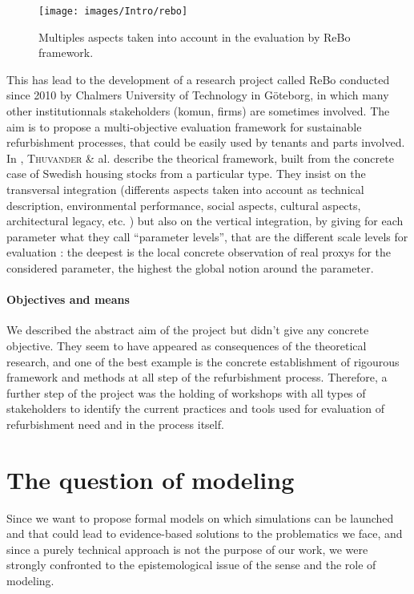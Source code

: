 \documentclass[english]{article}
\newcommand{\noun}[1]{\textsc{#1}}
\begin{document}
\begin{figure}
\texttt{[image: images/Intro/rebo]}\caption{Multiples aspects taken into account in the evaluation by ReBo framework.}


\end{figure}


\bigskip{}


This has lead to the development of a research project called ReBo
conducted since 2010 by Chalmers University of Technology in Göteborg,
in which many other institutionnals stakeholders (komun, firms) are
sometimes involved. The aim is to propose a multi-objective evaluation
framework for sustainable refurbishment processes, that could be easily
used by tenants and parts involved. In \cite{thuvander2011strategies},
\noun{Thuvander} \& al. describe the theorical framework, built from
the concrete case of Swedish housing stocks from a particular type.
They insist on the transversal integration (differents aspects taken
into account as technical description, environmental performance,
social aspects, cultural aspects, architectural legacy, etc. ) but
also on the vertical integration, by giving for each parameter what
they call ``parameter levels'', that are the different scale levels
for evaluation : the deepest is the local concrete observation of
real proxys for the considered parameter, the highest the global notion
around the parameter.


\paragraph{Objectives and means}

We described the abstract aim of the project but didn't give any concrete
objective. They seem to have appeared as consequences of the theoretical
research, and one of the best example is the concrete establishment
of rigourous framework and methods at all step of the refurbishment
process. Therefore, a further step of the project was the holding
of workshops with all types of stakeholders to identify the current
practices and tools used for evaluation of refurbishment need and
in the process itself.


\section{The question of modeling}

Since we want to propose formal models on which simulations can be
launched and that could lead to evidence-based solutions to the problematics
we face, and since a purely technical approach is not the purpose
of our work, we were strongly confronted to the epistemological issue
of the sense and the role of modeling.
\end{document}
